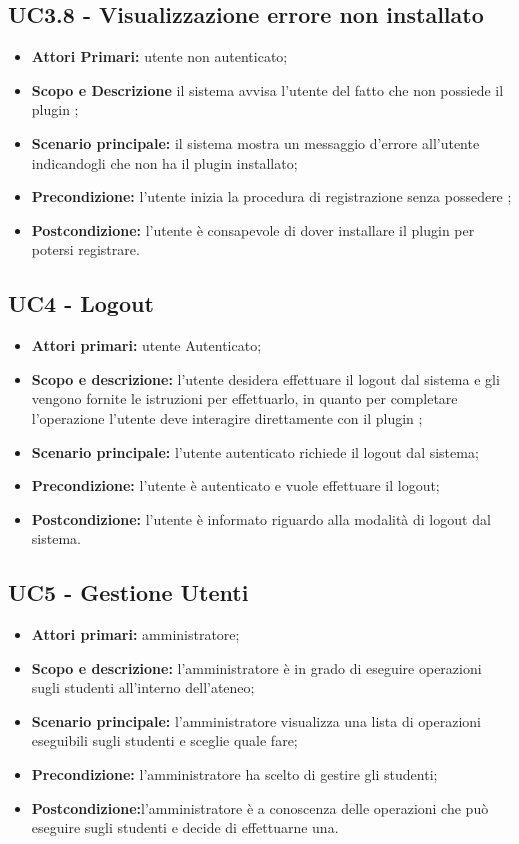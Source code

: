 \documentclass[AnalisiDeiRequisiti.tex]{subfiles}
\begin{document}
\subsection{UC3.8 - Visualizzazione errore  non installato}
\begin{itemize}
	\item \textbf{Attori Primari:} utente non autenticato;
	\item \textbf{Scopo e Descrizione} il sistema avvisa l'utente del fatto che non possiede il plugin ;
	\item \textbf{Scenario principale:} il sistema mostra un messaggio d'errore all'utente indicandogli che non ha il plugin  installato;
	\item \textbf{Precondizione:} l'utente inizia la procedura di registrazione senza possedere ;
	\item \textbf{Postcondizione:} l'utente è consapevole di dover installare il plugin  per potersi registrare.
\end{itemize}
\subsection{UC4 - Logout}
\begin{itemize}
	\item \textbf{Attori primari:} utente Autenticato;
	\item \textbf{Scopo e descrizione:} l'utente desidera effettuare il logout dal sistema e gli vengono fornite le istruzioni per effettuarlo, in quanto per completare l'operazione l'utente deve interagire direttamente con il plugin ;
	\item \textbf{Scenario principale:} l'utente autenticato richiede il logout dal sistema;
	\item \textbf{Precondizione:} l'utente è autenticato e vuole effettuare il logout;
	\item \textbf{Postcondizione:} l'utente è informato riguardo alla modalità di logout dal sistema.
\end{itemize}

\subsection{UC5 - Gestione Utenti}
\begin{itemize}
	\item \textbf{Attori primari:} amministratore;
	\item \textbf{Scopo e descrizione:} l'amministratore è in grado di eseguire operazioni sugli studenti all'interno dell'ateneo;
	\item \textbf{Scenario principale:} l'amministratore visualizza una lista di operazioni eseguibili sugli studenti e sceglie quale fare;
	\item \textbf{Precondizione:} l'amministratore ha scelto di gestire gli studenti; 
	\item \textbf{Postcondizione:}l'amministratore è a conoscenza delle operazioni che può eseguire sugli studenti e decide di effettuarne una.
\end{itemize}
\end{document}
